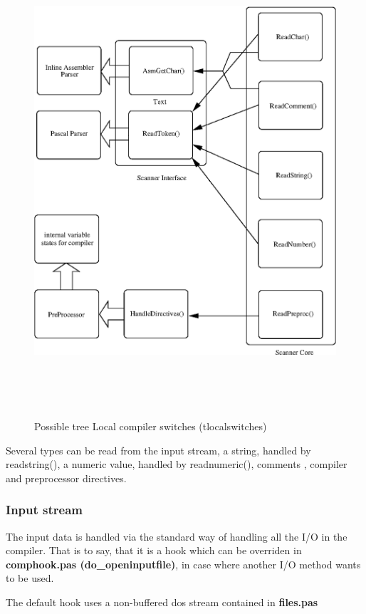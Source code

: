 \documentclass [12pt]{article}
\begin{document}
\begin{figure}
\includegraphics[width=5.87in,height=6.90in]{arch2.eps}
\fi
\caption{Possible tree Local compiler switches (tlocalswitches)}
\label{fig2}
\end{figure}

Several types can be read from the input stream, a string, handled by
readstring(), a numeric value, handled by readnumeric(), comments , compiler
and preprocessor directives.

\subsubsection{Input stream}
\label{subsubsec:input}

The input data is handled via the standard way of handling all the I/O in 
the compiler. That is to say, that it is a hook which can be overriden in 
\textbf{comphook.pas (do{\_}openinputfile)}, in case where another I/O 
method wants to be used. 

The default hook uses a non-buffered dos stream contained in 
\textbf{files.pas}
\end{document}
